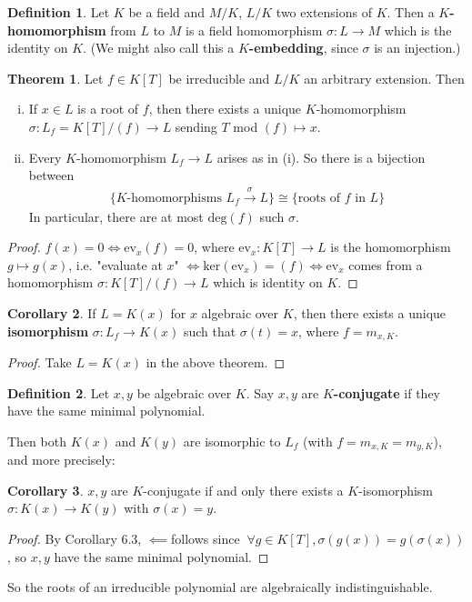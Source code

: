 \documentclass{article}
\theoremstyle{definition}
\newtheorem{theorem}{Theorem}[section]
\newtheorem{cor}[theorem]{Corollary}
\newtheorem{defn}{Definition}[section]
\begin{document}
\begin{defn}
    Let $K$ be a field and $M/K$, $L/K$ two extensions of $K$. Then a \textbf{$K$-homomorphism} from $L$ to $M$ is a field homomorphism $\sigma : L \to M$ which is the identity on $K$. (We might also call this a \textbf{$K$-embedding}, since $\sigma$ is an injection.)
\end{defn}
\begin{theorem}\label{6.2}
    Let $f \in K[T]$ be irreducible and $L/K$ an arbitrary extension. Then
    \begin{enumerate}[(i)]
        \item If $x \in L$ is a root of $f$, then there exists a unique $K$-homomorphism $\sigma : L_f = K[T]/(f) \to L$ sending $T$ mod $(f) \mapsto x$.
        \item Every $K$-homomorphism $L_f \to L$ arises as in (i). So there is a bijection between
        \begin{align*}
            \{K\text{-homomorphisms } L_f \stackrel{\sigma}{\to} L\} \cong \{\text{roots of }f \text{ in }L\}
        \end{align*}
        In particular, there are at most $\text{deg}(f)$ such $\sigma$.
    \end{enumerate}
\end{theorem}
\begin{proof}
    $f(x)=0 \iff \text{ev}_x(f)=0$, where $\text{ev}_x : K[T] \to L$ is the homomorphism $g \mapsto g(x)$, i.e. "evaluate at $x$" $\iff \text{ker}(\text{ev}_x) = (f) \iff \text{ev}_x$ comes from a homomorphism $\sigma : K[T]/(f) \to L$ which is identity on $K$.
\end{proof}
\begin{cor}
    If $L = K(x)$ for $x$ algebraic over $K$, then there exists a unique \textbf{isomorphism} $\sigma : L_f \to K(x)$ such that $\sigma(t)=x$, where $f=m_{x,K}$.  
\end{cor}
\begin{proof}
    Take $L = K(x)$ in the above theorem.
\end{proof}
\begin{defn}
    Let $x,y$ be algebraic over $K$. Say $x,y$ are \textbf{$K$-conjugate}  if they have the same minimal polynomial. 
\end{defn}
Then both $K(x)$ and $K(y)$ are isomorphic to $L_f$ (with $f=m_{x,K}=m_{y,K}$), and more precisely:
\begin{cor}
    $x,y$ are $K$-conjugate if and only there exists a $K$-isomorphism $\sigma : K(x) \to K(y)$ with $\sigma(x)=y$.
\end{cor}
\begin{proof}
    By Corollary 6.3, $\impliedby $follows since $~\forall  g \in K[T], \sigma(g(x))=g(\sigma(x))$, so $x,y$ have the same minimal polynomial.
\end{proof}
So the roots of an irreducible polynomial are algebraically indistinguishable.
\vspace{1mm}
\end{document}
